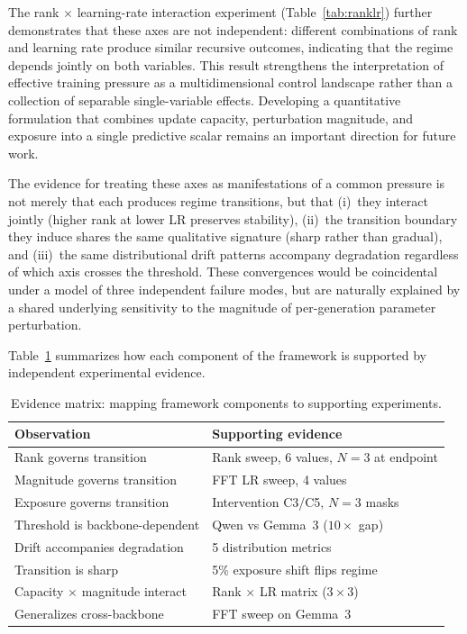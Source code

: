 \documentclass[a4paper,fleqn]{cas-dc}
\renewcommand{\arraystretch}{1.8}
\begin{document}
The rank $\times$ learning-rate interaction experiment
(Table~\ref{tab:ranklr}) further demonstrates that these axes are not
independent: different combinations of rank and learning rate produce similar
recursive outcomes, indicating that the regime depends jointly on both variables.
This result strengthens the interpretation of effective training pressure as a
multidimensional control landscape rather than a collection of separable
single-variable effects. Developing a quantitative formulation that combines
update capacity, perturbation magnitude, and exposure into a single predictive
scalar remains an important direction for future work.

The evidence for treating these axes as manifestations of a
common pressure is not merely that each produces regime transitions, but that
(i)~they interact jointly (higher rank at lower LR preserves stability),
(ii)~the transition boundary they induce shares the same qualitative signature
(sharp rather than gradual), and (iii)~the same distributional drift patterns
accompany degradation regardless of which axis crosses the threshold. These
convergences would be coincidental under a model of three independent failure
modes, but are naturally explained by a shared underlying sensitivity to the
magnitude of per-generation parameter perturbation.

Table~\ref{tab:evidence} summarizes how each component of the framework is
supported by independent experimental evidence.

\begin{table}[htbp]
\caption{Evidence matrix: mapping framework components to supporting
experiments.}\label{tab:evidence}
\footnotesize
\renewcommand{\arraystretch}{1.4}
\begin{tabular}{@{}ll@{}}
\toprule
\textbf{Observation} & \textbf{Supporting evidence} \\
\midrule
Rank governs transition & Rank sweep, 6 values, $N{=}3$ at endpoint \\
\addlinespace
Magnitude governs transition & FFT LR sweep, 4 values \\
\addlinespace
Exposure governs transition & Intervention C3/C5, $N{=}3$ masks \\
\addlinespace
Threshold is backbone-dependent & Qwen vs Gemma~3 ($10{\times}$ gap) \\
\addlinespace
Drift accompanies degradation & 5 distribution metrics \\
\addlinespace
Transition is sharp & 5\% exposure shift flips regime \\
\addlinespace
Capacity $\times$ magnitude interact & Rank $\times$ LR matrix ($3{\times}3$) \\
\addlinespace
Generalizes cross-backbone & FFT sweep on Gemma~3 \\
\bottomrule
\end{tabular}
\end{table}
\end{document}
